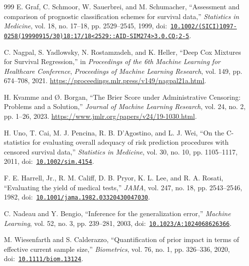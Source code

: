 \begin{thebibliography}{999}
\def\currentbiburl{https://doi.org/10.1002/(SICI)1097-0258(19990915/30)18:17/18<2529::AID-SIM274>3.0.CO;2-5}
E. Graf, C. Schmoor, W. Sauerbrei, and M. Schumacher, ``Assessment and comparison of prognostic classification schemes for survival data,'' \emph{Statistics in Medicine}, vol. 18, no. 17--18, pp. 2529--2545, 1999, doi:~\href{https://doi.org/10.1002/(SICI)1097-0258(19990915/30)18:17/18<2529::AID-SIM274>3.0.CO;2-5}{\nolinkurl{10.1002/(SICI)1097-0258(19990915/30)18:17/18<2529::AID-SIM274>3.0.CO;2-5}}.

\def\currentbiburl{https://proceedings.mlr.press/v149/nagpal21a.html}
 C. Nagpal, S. Yadlowsky, N. Rostamzadeh, and K. Heller, ``Deep Cox Mixtures for Survival Regression,'' in \emph{Proceedings of the 6th Machine Learning for Healthcare Conference}, \emph{Proceedings of Machine Learning Research}, vol. 149, pp. 674--708, 2021. \url{https://proceedings.mlr.press/v149/nagpal21a.html}.

\def\currentbiburl{https://www.jmlr.org/papers/v24/19-1030.html}
 H. Kvamme and Ø. Borgan, ``The Brier Score under Administrative Censoring: Problems and a Solution,'' \emph{Journal of Machine Learning Research}, vol. 24, no. 2, pp. 1--26, 2023. \url{https://www.jmlr.org/papers/v24/19-1030.html}.

\def\currentbiburl{https://doi.org/10.1002/sim.4154}
H. Uno, T. Cai, M. J. Pencina, R. B. D'Agostino, and L. J. Wei, ``On the C-statistics for evaluating overall adequacy of risk prediction procedures with censored survival data,'' \emph{Statistics in Medicine}, vol. 30, no. 10, pp. 1105--1117, 2011, doi:~\href{https://doi.org/10.1002/sim.4154}{\nolinkurl{10.1002/sim.4154}}.

\def\currentbiburl{https://doi.org/10.1001/jama.1982.03320430047030}
F. E. Harrell, Jr., R. M. Califf, D. B. Pryor, K. L. Lee, and R. A. Rosati, ``Evaluating the yield of medical tests,'' \emph{JAMA}, vol. 247, no. 18, pp. 2543--2546, 1982, doi:~\href{https://doi.org/10.1001/jama.1982.03320430047030}{\nolinkurl{10.1001/jama.1982.03320430047030}}.

\def\currentbiburl{https://doi.org/10.1023/A:1024068626366}
C. Nadeau and Y. Bengio, ``Inference for the generalization error,'' \emph{Machine Learning}, vol. 52, no. 3, pp. 239--281, 2003, doi:~\href{https://doi.org/10.1023/A:1024068626366}{\nolinkurl{10.1023/A:1024068626366}}.

\def\currentbiburl{https://doi.org/10.1111/biom.13124}
 M. Wiesenfarth and S. Calderazzo, ``Quantification of prior impact in terms of effective current sample size,'' \emph{Biometrics}, vol. 76, no. 1, pp. 326--336, 2020, doi:~\href{https://doi.org/10.1111/biom.13124}{\nolinkurl{10.1111/biom.13124}}.


\end{thebibliography}
